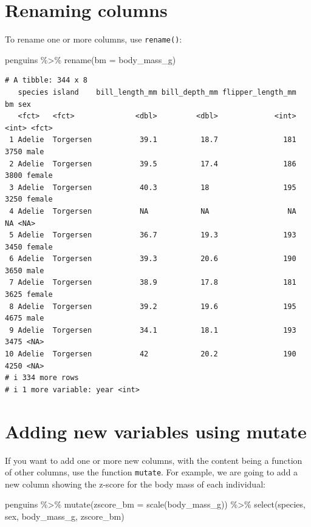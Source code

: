 \documentclass[
  letterpaper,
  DIV=11,
  numbers=noendperiod]{scrreprt}
\newenvironment{Shaded}{\begin{snugshade}}{\end{snugshade}}
\newcommand{\AttributeTok}[1]{\textcolor[rgb]{0.40,0.45,0.13}{#1}}
\newcommand{\FunctionTok}[1]{\textcolor[rgb]{0.28,0.35,0.67}{#1}}
\newcommand{\NormalTok}[1]{\textcolor[rgb]{0.00,0.23,0.31}{#1}}
\newcommand{\SpecialCharTok}[1]{\textcolor[rgb]{0.37,0.37,0.37}{#1}}
\begin{document}
\hypertarget{renaming-columns}{%
\section{Renaming columns}\label{renaming-columns}}

To rename one or more columns, use \texttt{rename()}:

\begin{Shaded}
\begin{Highlighting}[]
\NormalTok{penguins }\SpecialCharTok{\%\textgreater{}\%} 
  \FunctionTok{rename}\NormalTok{(}\AttributeTok{bm =}\NormalTok{ body\_mass\_g)}
\end{Highlighting}
\end{Shaded}

\begin{verbatim}
# A tibble: 344 x 8
   species island    bill_length_mm bill_depth_mm flipper_length_mm    bm sex   
   <fct>   <fct>              <dbl>         <dbl>             <int> <int> <fct> 
 1 Adelie  Torgersen           39.1          18.7               181  3750 male  
 2 Adelie  Torgersen           39.5          17.4               186  3800 female
 3 Adelie  Torgersen           40.3          18                 195  3250 female
 4 Adelie  Torgersen           NA            NA                  NA    NA <NA>  
 5 Adelie  Torgersen           36.7          19.3               193  3450 female
 6 Adelie  Torgersen           39.3          20.6               190  3650 male  
 7 Adelie  Torgersen           38.9          17.8               181  3625 female
 8 Adelie  Torgersen           39.2          19.6               195  4675 male  
 9 Adelie  Torgersen           34.1          18.1               193  3475 <NA>  
10 Adelie  Torgersen           42            20.2               190  4250 <NA>  
# i 334 more rows
# i 1 more variable: year <int>
\end{verbatim}

\hypertarget{adding-new-variables-using-mutate}{%
\section{Adding new variables using
mutate}\label{adding-new-variables-using-mutate}}

If you want to add one or more new columns, with the content being a
function of other columns, use the function \texttt{mutate}. For
example, we are going to add a new column showing the z-score for the
body mass of each individual:

\begin{Shaded}
\begin{Highlighting}[]
\NormalTok{penguins }\SpecialCharTok{\%\textgreater{}\%} 
  \FunctionTok{mutate}\NormalTok{(}\AttributeTok{zscore\_bm =} \FunctionTok{scale}\NormalTok{(body\_mass\_g)) }\SpecialCharTok{\%\textgreater{}\%} 
  \FunctionTok{select}\NormalTok{(species, sex, body\_mass\_g, zscore\_bm)}
\end{Highlighting}
\end{Shaded}
\end{document}
